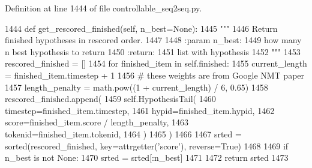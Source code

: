 Definition at line 1444 of file controllable\+\_\+seq2seq.\+py.


\begin{DoxyCode}
1444     \textcolor{keyword}{def }get\_rescored\_finished(self, n\_best=None):
1445         \textcolor{stringliteral}{"""}
1446 \textcolor{stringliteral}{        Return finished hypotheses in rescored order.}
1447 \textcolor{stringliteral}{}
1448 \textcolor{stringliteral}{        :param n\_best:}
1449 \textcolor{stringliteral}{            how many n best hypothesis to return}
1450 \textcolor{stringliteral}{        :return:}
1451 \textcolor{stringliteral}{            list with hypothesis}
1452 \textcolor{stringliteral}{        """}
1453         rescored\_finished = []
1454         \textcolor{keywordflow}{for} finished\_item \textcolor{keywordflow}{in} self.finished:
1455             current\_length = finished\_item.timestep + 1
1456             \textcolor{comment}{# these weights are from Google NMT paper}
1457             length\_penalty = math.pow((1 + current\_length) / 6, 0.65)
1458             rescored\_finished.append(
1459                 self.HypothesisTail(
1460                     timestep=finished\_item.timestep,
1461                     hypid=finished\_item.hypid,
1462                     score=finished\_item.score / length\_penalty,
1463                     tokenid=finished\_item.tokenid,
1464                 )
1465             )
1466 
1467         srted = sorted(rescored\_finished, key=attrgetter(\textcolor{stringliteral}{'score'}), reverse=\textcolor{keyword}{True})
1468 
1469         \textcolor{keywordflow}{if} n\_best \textcolor{keywordflow}{is} \textcolor{keywordflow}{not} \textcolor{keywordtype}{None}:
1470             srted = srted[:n\_best]
1471 
1472         \textcolor{keywordflow}{return} srted
1473 
\end{DoxyCode}
\mbox{\label{classprojects_1_1controllable__dialogue_1_1controllable__seq2seq_1_1controllable__seq2seq_1_1Beam_a9b904d4d56ca519849dbb3c3d51ebc68}} 
